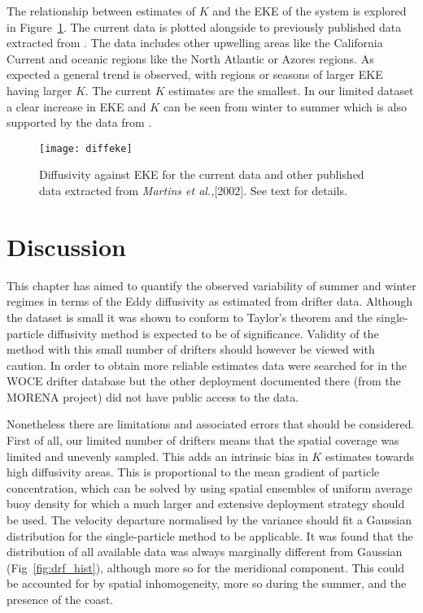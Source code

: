 The relationship between estimates of $K$ and the EKE of the
system is explored in Figure~\ref{fig:drf_diffeke}. The current
data is plotted alongside to previously published data extracted
from \citet[][and references therein]{Martins02}. The data
includes other upwelling areas like the California Current and
oceanic regions like the North Atlantic or Azores regions. As
expected a general trend is observed, with regions or seasons of
larger EKE having larger $K$. The current $K$ estimates are the
smallest. In our limited dataset a clear increase in EKE and $K$
can be seen from winter to summer which is also supported by the
data from \citet{Haynes91}.
\begin{figure}
\centering %
\texttt{[image: diffeke]}
\caption{Diffusivity against EKE for the current data and other
published data extracted from \emph{Martins et al.,}[2002]. See
text for details.}
\label{fig:drf_diffeke}%
\end{figure}



\section{Discussion}
This chapter has aimed to quantify the observed variability of
summer and winter regimes in terms of the Eddy diffusivity as
estimated from drifter data. Although the dataset is small it was
shown to conform to Taylor's theorem and the single-particle
diffusivity method is expected to be of significance. Validity of
the method with this small number of drifters should however be
viewed with caution. In order to obtain more reliable estimates
data were searched for in the WOCE drifter database but the other
deployment documented there (from the MORENA project) did not have
public access to the data.

Nonetheless there are limitations and associated errors that
should be considered. First of all, our limited number of drifters
means that the spatial coverage was limited and unevenly sampled.
This adds an intrinsic bias in $K$ estimates towards high
diffusivity areas. This is proportional to the mean gradient of
particle concentration, which can be solved by using spatial
ensembles of uniform average buoy density for which a much larger
and extensive deployment strategy should be used. The velocity
departure normalised by the variance should fit a Gaussian
distribution for the single-particle method to be applicable. It
was found that the distribution of all available data was always
marginally different from Gaussian (Fig~\ref{fig:drf_hist}),
although more so for the meridional component. This could be
accounted for by spatial inhomogeneity, more so during the summer,
and the presence of the coast.

